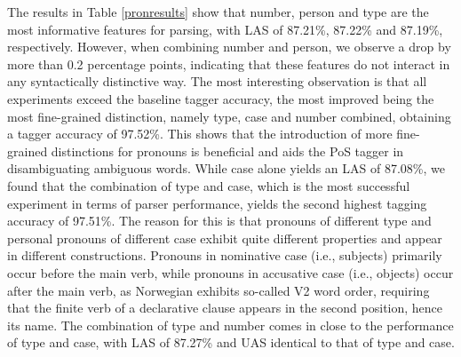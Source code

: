 \documentclass[11pt,a4paper]{article}
\begin{document}
The results in Table \ref{pronresults} show that number, person and type are
the most informative features for parsing, with LAS of 87.21\%, 87.22\% and
87.19\%, respectively. However, when combining number and person, we observe a
drop by more than 0.2 percentage points, indicating that these features do not
interact in any syntactically distinctive way. The most interesting observation
is that all experiments exceed the baseline tagger accuracy, the most improved
being the most fine-grained distinction, namely type, case and number combined,
obtaining a tagger accuracy of 97.52\%. This shows that the introduction of
more fine-grained distinctions for pronouns is beneficial and aids the PoS
tagger in disambiguating ambiguous words. While case alone yields an LAS of
87.08\%, we found that the combination of type and case, which is the most
successful experiment in terms of parser performance, yields the second highest
tagging accuracy of 97.51\%. The reason for this is that pronouns of different
type and personal pronouns of different case exhibit quite different properties
and appear in different constructions. Pronouns in nominative case (i.e.,
subjects) primarily occur before the main verb, while pronouns in accusative
case (i.e., objects) occur after the main verb, as Norwegian exhibits so-called
V2 word order, requiring that the finite verb of a declarative clause appears
in the second position, hence its name. The combination of type and number
comes in close to the performance of type and case, with LAS of 87.27\% and UAS
identical to that of type and case.
\end{document}
